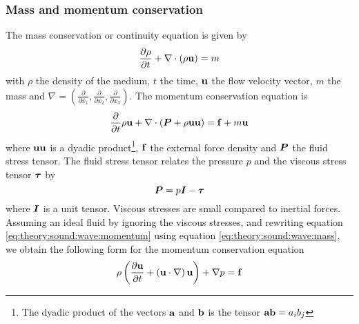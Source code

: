 \subsubsection*{Mass and momentum conservation}
The mass conservation or continuity equation is given by
\begin{equation}\label{eq:theory:sound:wave:mass}
 \frac{\partial \rho}{\partial t} + \nabla \cdot \left( \rho \mathbf{u} \right) = m
\end{equation}
with $\rho$ the density of the medium, $t$ the time, $\mathbf{u}$ the flow velocity
vector, $m$ the mass and $\nabla = \left( \frac{\partial}{\partial
x_1},\frac{\partial}{\partial x_2},\frac{\partial}{\partial x_3} \right)$.
The momentum conservation equation is
\begin{equation}\label{eq:theory:sound:wave:momentum}
 \frac{\partial}{\partial t} \rho \mathbf{u} + \nabla \cdot \left(\bm{P} + \rho \mathbf{u} \mathbf{u}  \right) = \mathbf{f} + m \mathbf{u}
\end{equation}
where $\mathbf{u} \mathbf{u}$ is a dyadic product\footnote{The dyadic product of the
vectors $\mathbf{a}$ and $\mathbf{b}$ is the tensor $\mathbf{a}\mathbf{b}=a_i b_j$},
$\mathbf{f}$ the external force density and $\bm{P}$ the fluid stress tensor.
The fluid stress tensor relates the pressure $p$ and the viscous stress tensor
$\bm{\tau}$ by
\begin{equation}
  \bm{P} = p \bm{I} - \bm{\tau}
\end{equation}
where $\bm{I}$ is a unit tensor. Viscous stresses are small compared to inertial
forces. Assuming an ideal fluid by ignoring the viscous stresses, and rewriting equation
\eqref{eq:theory:sound:wave:momentum} using equation
\eqref{eq:theory:sound:wave:mass}, we obtain the following form for the momentum conservation equation
\begin{equation}
 \rho \left( \frac{\partial \mathbf{u}}{\partial t} + \left( \mathbf{u} \cdot \nabla \right) \mathbf{u} \right) + \nabla p = \mathbf{f}
\end{equation}

